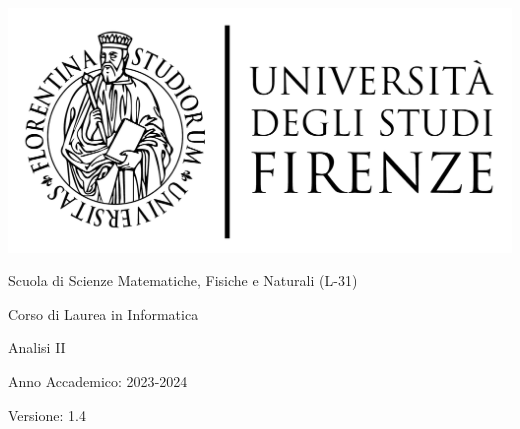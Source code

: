 \documentclass[11pt]{article}
\newcommand{\myDegree}{Corso di Laurea in Informatica}
\newcommand{\myFaculty}{
	Scuola di Scienze Matematiche, Fisiche e Naturali (L{-}31)}
\newcommand{\myTime}{Anno Accademico{:} 2023{-}2024}
\newcommand{\myVersion}{1.4}
\begin{document}
\begin{titlepage}
   \begin{center}
      \hfill
      \vspace{2cm}

      \begingroup
      \large
      \includegraphics[scale=0.15]{images/unifi-logo}

      \myFaculty{}

      \myDegree{}
      \endgroup

      \vspace{5cm}

      \begingroup
      \LARGE
      \color{red} Analisi II
      \endgroup
      \medskip

      \myTime{}

      \vfill

      \begingroup
      \hfill Versione: \myVersion{}
      \endgroup

   \end{center}
\end{titlepage}
\newpage

\tableofcontents
\newpage


\newpage


\newpage


\newpage


\newpage
\end{document}
